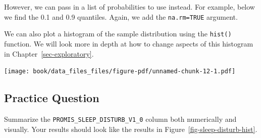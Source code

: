 \documentclass[
  letterpaper,
]{krantz}
\makeatletter
\newenvironment{Shaded}{\begin{snugshade}}{\end{snugshade}}
\newcommand{\AttributeTok}[1]{\textcolor[rgb]{0.40,0.45,0.13}{#1}}
\newcommand{\CommentTok}[1]{\textcolor[rgb]{0.37,0.37,0.37}{#1}}
\newcommand{\ConstantTok}[1]{\textcolor[rgb]{0.56,0.35,0.01}{#1}}
\newcommand{\FloatTok}[1]{\textcolor[rgb]{0.68,0.00,0.00}{#1}}
\newcommand{\FunctionTok}[1]{\textcolor[rgb]{0.28,0.35,0.67}{#1}}
\newcommand{\NormalTok}[1]{\textcolor[rgb]{0.00,0.23,0.31}{#1}}
\newcommand{\SpecialCharTok}[1]{\textcolor[rgb]{0.37,0.37,0.37}{#1}}
\newenvironment{kframe}{%
\medskip{}
\setlength{\fboxsep}{.8em}
 \def\at@end@of@kframe{}%
 \ifinner\ifhmode%
  \def\at@end@of@kframe{\end{minipage}}%
  \begin{minipage}{\columnwidth}%
 \fi\fi%
 \def\FrameCommand##1{\hskip\@totalleftmargin \hskip-\fboxsep
 \colorbox{shadecolor}{##1}\hskip-\fboxsep
     \hskip-\linewidth \hskip-\@totalleftmargin \hskip\columnwidth}%
 \MakeFramed {\advance\hsize-\width
   \@totalleftmargin\z@ \linewidth\hsize
   \@setminipage}}%
 {\par\unskip\endMakeFramed%
 \at@end@of@kframe}
\renewenvironment{Shaded}{\begin{kframe}}{\end{kframe}}
\makeatother
\begin{document}
\begin{Shaded}
\end{Shaded}

However, we can pass in a list of probabilities to use instead. For
example, below we find the 0.1 and 0.9 quantiles. Again, we add the
\texttt{na.rm=TRUE} argument.

\begin{Shaded}
\end{Shaded}

We can also plot a histogram of the sample distribution using the
\texttt{hist()} function. We will look more in depth at how to change
aspects of this histogram in Chapter~\ref{sec-exploratory}.

\begin{Shaded}
\end{Shaded}

\begin{center}
\texttt{[image: book/data\_files\_files/figure-pdf/unnamed-chunk-12-1.pdf]}
\end{center}

\subsection{Practice Question}\label{practice-question-3}

Summarize the \texttt{PROMIS\_SLEEP\_DISTURB\_V1\_0} column both
numerically and visually. Your results should look like the results in
Figure~\ref{fig-sleep-disturb-hist}.
\end{document}
